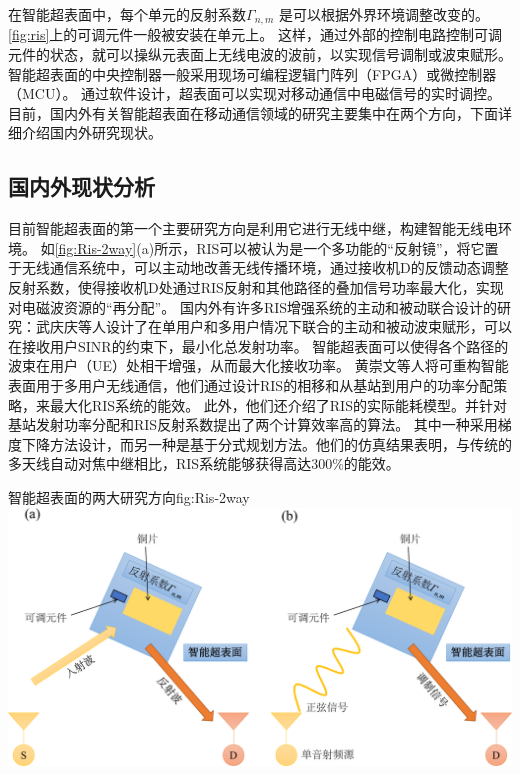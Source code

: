 \documentclass[supercite]{HustGraduPaper}
\begin{document}
在智能超表面中，每个单元的反射系数$ \Gamma _ {n,m} $ 是可以根据外界环境调整改变的。
\autoref{fig:ris}上的可调元件一般被安装在单元上。
这样，通过外部的控制电路控制可调元件的状态，就可以操纵元表面上无线电波的波前，以实现信号调制或波束赋形。
智能超表面的中央控制器一般采用现场可编程逻辑门阵列（FPGA）或微控制器（MCU）。
通过软件设计，超表面可以实现对移动通信中电磁信号的实时调控\cite{CHN_zhou2020}。
目前，国内外有关智能超表面在移动通信领域的研究主要集中在两个方向\cite{CHN_zhou2020}，下面详细介绍国内外研究现状。

\subsection{国内外现状分析}


目前智能超表面的第一个主要研究方向是利用它进行无线中继，构建智能无线电环境。
如\autoref{fig:Ris-2way}(a)所示，RIS可以被认为是一个多功能的“反射镜”，将它置于无线通信系统中，可以主动地改善无线传播环境，通过接收机D的反馈动态调整反射系数，使得接收机D处通过RIS反射和其他路径的叠加信号功率最大化，实现对电磁波资源的“再分配”。
国内外有许多RIS增强系统的主动和被动联合设计的研究：武庆庆等人设计了在单用户和多用户情况下联合的主动和被动波束赋形，可以在接收用户SINR的约束下，最小化总发射功率\cite{Wu2019}。
智能超表面可以使得各个路径的波束在用户（UE）处相干增强，从而最大化接收功率。
黄崇文等人将可重构智能表面用于多用户无线通信，他们通过设计RIS的相移和从基站到用户的功率分配策略，来最大化RIS系统的能效。
此外，他们还介绍了RIS的实际能耗模型。并针对基站发射功率分配和RIS反射系数提出了两个计算效率高的算法。
其中一种采用梯度下降方法设计，而另一种是基于分式规划方法。他们的仿真结果表明，与传统的多天线自动对焦中继相比，RIS系统能够获得高达300\%的能效\cite{huang2019reconfigurable}。

\begin{generalfig}[htb]{智能超表面的两大研究方向}{fig:Ris-2way}
	\includegraphics[width=0.8\linewidth]{Figures/Ris-2way.pdf}
\end{generalfig}
\end{document}
